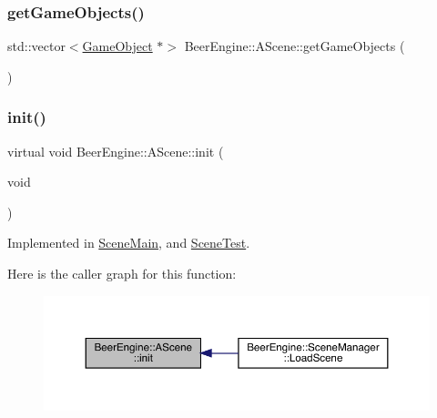 \subsubsection{\texorpdfstring{get\+Game\+Objects()}{getGameObjects()}}
{\footnotesize\ttfamily std\+::vector$<$\mbox{\hyperlink{class_beer_engine_1_1_game_object}{Game\+Object}} $\ast$$>$ Beer\+Engine\+::\+A\+Scene\+::get\+Game\+Objects (\begin{DoxyParamCaption}{ }\end{DoxyParamCaption})}

\mbox{\label{class_beer_engine_1_1_a_scene_a7a55b4e506ae618e6596ae812ad48db0}} 
\subsubsection{\texorpdfstring{init()}{init()}}
{\footnotesize\ttfamily virtual void Beer\+Engine\+::\+A\+Scene\+::init (\begin{DoxyParamCaption}\item[{void}]{ }\end{DoxyParamCaption})\hspace{0.3cm}{\ttfamily [pure virtual]}}



Implemented in \mbox{\hyperlink{class_scene_main_a4406dc5cf9807edcf360ba416de928e2}{Scene\+Main}}, and \mbox{\hyperlink{class_scene_test_aedded03410798c3705fb3fb028e56ab5}{Scene\+Test}}.

Here is the caller graph for this function\+:
\nopagebreak
\begin{figure}[H]
\begin{center}
\leavevmode
\includegraphics[width=350pt]{class_beer_engine_1_1_a_scene_a7a55b4e506ae618e6596ae812ad48db0_icgraph}
\end{center}
\end{figure}
\mbox{\label{class_beer_engine_1_1_a_scene_a2bd087ae22796d1e286c867f4f1ecc38}} 
